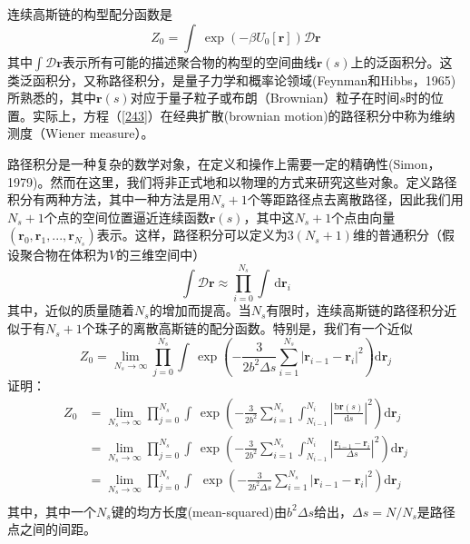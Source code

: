 连续高斯链的构型配分函数是
\begin{equation}
Z_0=\int ~\exp(-\beta U_0[\mathbf{r}])\mathcal{D}\mathbf{r} \label{243}
\end{equation}
其中$\int \mathcal{D}\mathbf{r}$表示所有可能的描述聚合物的构型的空间曲线$\mathbf{r}(s)$上的泛函积分。这类泛函积分，又称路径积分，是量子力学和概率论领域(Feynman和Hibbs，1965)所熟悉的，其中$\mathbf{r}(s)$对应于量子粒子或布朗（Brownian）粒子在时间$s$时的位置。实际上，方程（\ref{243}）在经典扩散(brownian motion)的路径积分中称为维纳测度（Wiener measure）。

路径积分是一种复杂的数学对象，在定义和操作上需要一定的精确性(Simon，1979)。然而在这里，我们将非正式地和以物理的方式来研究这些对象。定义路径积分有两种方法，其中一种方法是用$N_s+1$个等距路径点去离散路径，因此我们用$N_s+1$个点的空间位置逼近连续函数$\mathbf{r}(s)$，其中这$N_s+1$个点由向量$(\mathbf{r}_0,\mathbf{r}_1,...,\mathbf{r}_{N_s})$表示。这样，路径积分可以定义为$3(N_s+1)$维的普通积分（假设聚合物在体积为$V$的三维空间中）
\begin{equation}\label{244}
\int \mathcal{D}\mathbf{r}\approx \prod_{i=0}^{N_s} \int \, \mathrm{d} \mathbf{r}_i
\end{equation}
其中，近似的质量随着$N_s$的增加而提高。当$N_s$有限时，连续高斯链的路径积分近似于有$N_s+1$个珠子的离散高斯链的配分函数。特别是，我们有一个近似
\begin{equation}\label{245}
Z_0=\lim_{N_s \to \infty} \prod_{j=0}^{N_s} \int \,\exp \left( -\frac{3}{2b^2\Delta s}\sum_{i=1}^{N_s}\left|\mathbf{r}_{i-1}-\mathbf{r}_i \right|^2 \right) \mathrm{d} \mathbf{r}_j 
\end{equation}
证明：
\begin{equation*}
\begin{aligned}
Z_0 &=\lim_{N_s \to \infty} \prod_{j=0}^{N_s} \int \,\exp\left(-\frac{3}{2b^2} \sum_{i=1}^{N_s} \int _{N_{i-1}}^{N_i} \left| \frac{\mathrm{b} \mathbf{r} (s) } {\mathrm{d} s} \right|^2 \right) \mathrm{d} \mathbf{r}_j\\ 
& =  \lim_{N_s \to \infty} \prod_{j=0}^{N_s} \int \, \exp\left(-\frac{3}{2b^2}\sum_{i=1}^{N_s}\int _{N_{i-1}}^{N_i}\left|\frac{\mathbf{r}_{i-1}-\mathbf{r}_i}{\Delta s} \right|^2 \right)\mathrm{d} \mathbf{r}_j \\ 
&=  \lim_{N_s \to \infty} \prod_{j=0}^{N_s} \int \,~\exp \left( -\frac{3}{2b^2\Delta s}\sum_{i=1}^{N_s}\left|\mathbf{r}_{i-1}-\mathbf{r}_i \right|^2 \right) \mathrm{d} \mathbf{r}_j\\ 
\end{aligned}
\end{equation*}
其中，其中一个$N_s$键的均方长度(mean-squared)由$b^2\Delta s$给出，$\Delta s=N/N_s$是路径点之间的间距。

